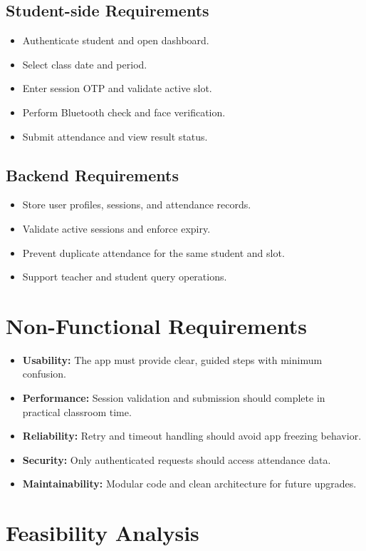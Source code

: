 \subsection{Student-side Requirements}
\begin{itemize}
\item Authenticate student and open dashboard.
\item Select class date and period.
\item Enter session OTP and validate active slot.
\item Perform Bluetooth check and face verification.
\item Submit attendance and view result status.
\end{itemize}

\subsection{Backend Requirements}
\begin{itemize}
\item Store user profiles, sessions, and attendance records.
\item Validate active sessions and enforce expiry.
\item Prevent duplicate attendance for the same student and slot.
\item Support teacher and student query operations.
\end{itemize}

\section{Non-Functional Requirements}
\begin{itemize}
\item \textbf{Usability:} The app must provide clear, guided steps with minimum confusion.
\item \textbf{Performance:} Session validation and submission should complete in practical classroom time.
\item \textbf{Reliability:} Retry and timeout handling should avoid app freezing behavior.
\item \textbf{Security:} Only authenticated requests should access attendance data.
\item \textbf{Maintainability:} Modular code and clean architecture for future upgrades.
\end{itemize}

\section{Feasibility Analysis}
